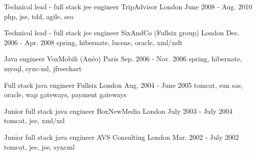

\begin{cventries}

  \cventry
    {Technical lead - full stack jee engineer} %
    {\hspace{0.5em}TripAdvisor} %
    {London} %
    {June 2008 - Aug. 2010} %
    {php, jse, tdd, agile, seo} %
    {}

  \cventry
    {Technical lead - full stack jee engineer} %
    {\hspace{0.5em}SixAndCo (Fullsix group)} %
    {London} %
    {Dec. 2006 - Apr. 2008} %
    {spring, hibernate, lucene, oracle, xml/xslt} %
    {}

  \cventry
    {Java engineer} %
    {\hspace{0.5em}VoxMobili (Anéo)} %
    {Paris} %
    {Sep. 2006 - Nov. 2006} %
    {spring, hibernate, mysql, sync-ml, jfreechart} %
    {}

  \cventry
    {Full stack java engineer} %
    {\hspace{0.5em}Fullsix} %
    {London} %
    {Aug. 2004 - June 2005} %
    {tomcat, sun sas, oracle, wap gateways, payment gateways} %
    {}

  \cventry
    {Junior full stack java engineer} %
    {BoxNewMedia} %
    {London} %
    {July 2003 - July 2004} %
    {tomcat, jee, xml/xsl} %
    {}

  \cventry
    {Junior full stack java engineer} %
    {AVS Consulting} %
    {London} %
    {Mar. 2002 - July 2002} %
    {tomcat, jee, jse, syncml} %
    {}

\end{cventries}